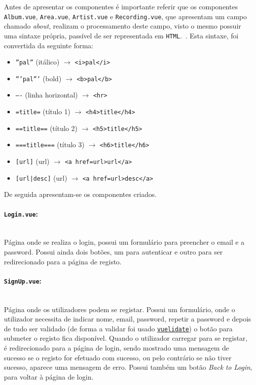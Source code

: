 \documentclass{article}
\begin{document}
\vspace{10px}

Antes de apresentar os componentes é importante referir que os componentes \texttt{Album.vue}, \texttt{Area.vue}, \texttt{Artist.vue} e \texttt{Recording.vue}, que apresentam um campo chamado \textit{about}, realizam o processamento deste campo, visto o mesmo possuir uma sintaxe própria, passível de ser representada em \texttt{HTML}.~\cite{mbAnnotation}. Esta sintaxe, foi convertida da seguinte forma:
\begin{itemize}
    \item \texttt{''pal''} (itálico) $\to$ \verb|<i>pal</i>|
    \item \texttt{'''pal'''} (bold) $\to$ \verb|<b>pal</b>|
    \item \texttt{----} (linha horizontal) $\to$ \verb|<hr>|
    \item \texttt{=title=} (título 1) $\to$ \verb|<h4>title</h4>|
    \item \texttt{==title==} (título 2) $\to$ \verb|<h5>title</h5>|
    \item \texttt{===title===} (título 3) $\to$ \verb|<h6>title</h6>|
    \item \texttt{[url]} (url) $\to$ \verb|<a href=url>url</a>|
    \item \texttt{[url|desc]} (url) $\to$ \verb|<a href=url>desc</a>|
\end{itemize}

De seguida apresentam-se os componentes criados.

\paragraph{\texttt{Login.vue}:}\mbox{}\\

Página onde se realiza o login, possui um formulário para preencher o email e a password. Possui ainda dois botões, um para autenticar e outro para ser redirecionado para a página de registo.

\paragraph{\texttt{SignUp.vue}:}\mbox{}\\

Página onde os utilizadores podem se registar. Possui um formulário, onde o utilizador necessita de indicar nome, email, password, repetir a password e depois de tudo ser validado (de forma a validar foi usado \href{https://vuelidate.netlify.com/}{\texttt{vuelidate}}) o botão para submeter o registo fica disponível. Quando o utilizador carregar para se registar, é redirecionado para a página de login, sendo mostrado uma mensagem de sucesso se o registo for efetuado com sucesso, ou pelo contrário se não tiver sucesso, aparece uma mensagem de erro. Possui também um botão \textit{Back to Login}, para voltar à página de login.
\end{document}
